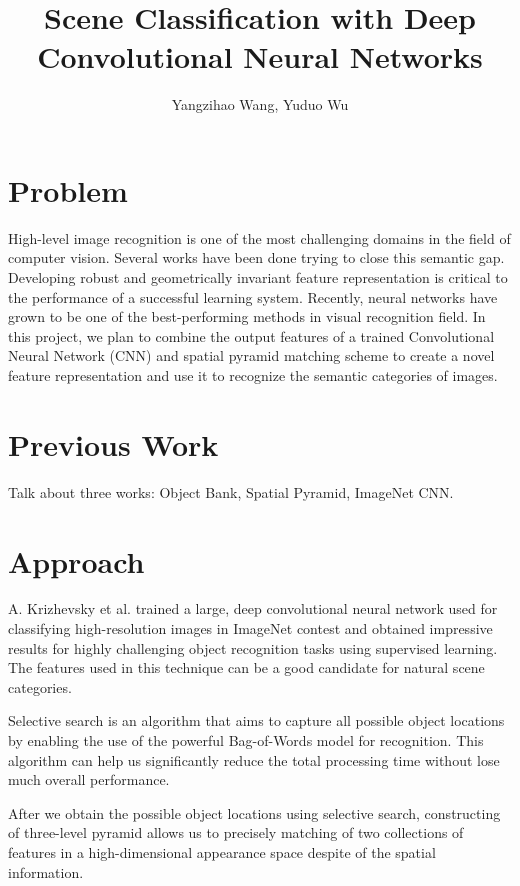 \documentclass[letterpaper,twocolumn,11pt]{article}
\title{Scene Classification with Deep Convolutional Neural Networks}
\author{Yangzihao Wang, Yuduo Wu}
\date{} %
\begin{document}
\maketitle

\section{Problem}
High-level image recognition is one of the most challenging domains in the field of computer vision. Several works have been done trying to close this semantic gap. Developing robust and geometrically invariant feature representation is critical to the performance of a successful learning system. Recently, neural networks have grown to be one of the best-performing methods in visual recognition field. In this project, we plan to combine the output features of a trained Convolutional Neural Network (CNN) and spatial pyramid matching scheme to create a novel feature representation and use it to recognize the semantic categories of images.

\section{Previous Work}
Talk about three works: Object Bank, Spatial Pyramid, ImageNet CNN.

\section{Approach}
\par
	A. Krizhevsky et al.\cite{CNN} trained a large, deep convolutional neural
	network used for classifying high-resolution images in ImageNet contest
	and obtained impressive results for highly challenging object recognition
	tasks using	supervised learning. The features used in this technique can
	be a good candidate for natural scene categories.

\par
	Selective search\cite{SS} is an algorithm that aims to capture all possible
	object locations by enabling the use of the powerful Bag-of-Words model
	for recognition. This algorithm can help us significantly reduce the total
	processing time without lose much overall performance.

\par
	After we obtain the possible object locations using selective search,
	constructing of three-level pyramid allows us to precisely matching of two
	collections of features in a high-dimensional appearance space despite
	of the spatial information.\cite{SPM}
\end{document}
